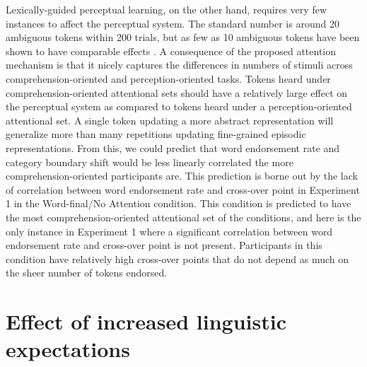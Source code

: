 Lexically-guided perceptual learning, on the other hand, requires very few instances to affect the perceptual system.
The standard number is around 20 ambiguous tokens within 200 trials, but as few as 10 ambiguous tokens have been shown to have comparable effects \citep{Kraljic2008}.
A consequence of the proposed attention mechanism is that it nicely captures the differences in numbers of stimuli across comprehension-oriented and perception-oriented tasks.
Tokens heard under comprehension-oriented attentional sets should have a relatively large effect on the perceptual system as compared to tokens heard under a perception-oriented attentional set.
A single token updating a more abstract representation will generalize more than many repetitions updating fine-grained episodic representations.
From this, we could predict that word endorsement rate and category boundary shift would be less linearly correlated the more comprehension-oriented participants are.
This prediction is borne out by the lack of correlation between word endorsement rate and cross-over point in Experiment 1 in the Word-final/No Attention condition.
This condition is predicted to have the most comprehension-oriented attentional set of the conditions, and here is the only instance in Experiment 1 where a significant correlation between word endorsement rate and cross-over point is not present.
Participants in this condition have relatively high cross-over points that do not depend as much on the sheer number of tokens endorsed.

\section{Effect of increased linguistic expectations}

